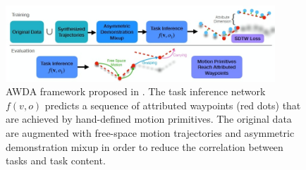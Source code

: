 \begin{figure}[t]
    \centering
    \includegraphics[width=0.9\textwidth]{figures/images/awda/awda_framework.jpg}
    \caption{AWDA framework proposed in \cite{chang2023one}. The task inference network $f(v,o)$ predicts a sequence of attributed waypoints (red dots) that are achieved by hand-defined motion primitives. The original data are augmented with free-space motion trajectories and asymmetric demonstration mixup in order to reduce the correlation between tasks and task content.}
    \label{fig:awda_framework}
\end{figure}
